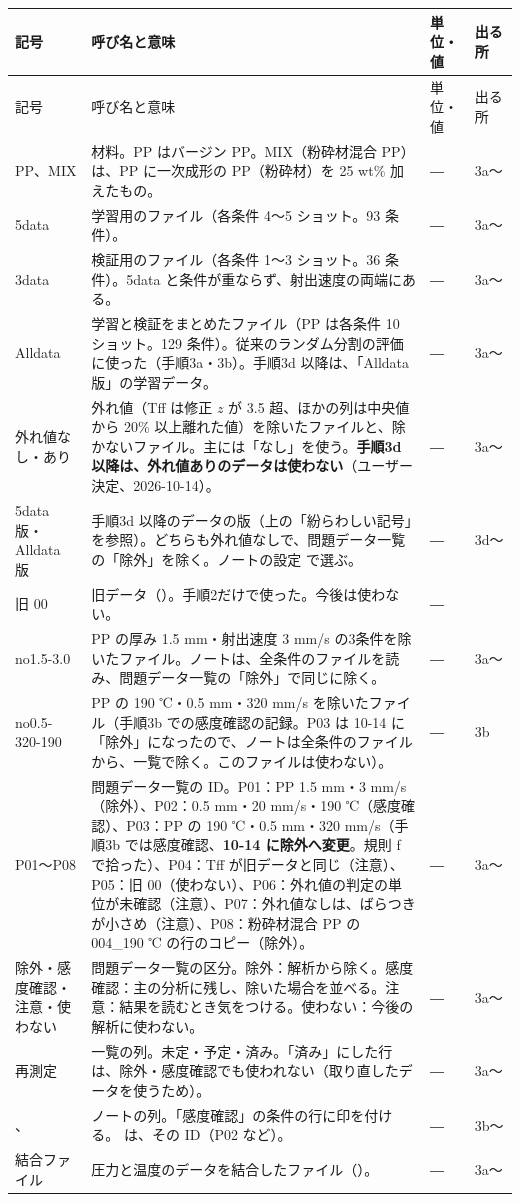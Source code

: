 \documentclass[paper=a4paper,fontsize=10.5pt,line_length=44zw,number_of_lines=38]{jlreq}
\makeatletter
\newcommand{\file}[1]{\texttt{\detokenize{#1}}}
\newenvironment{symtab}{%
  \begin{longtable}{@{}>{\raggedright\arraybackslash}p{6.5\zw}>{\raggedright\arraybackslash}p{22\zw}>{\raggedright\arraybackslash}p{6\zw}>{\raggedright\arraybackslash}p{4.5\zw}@{}}
  \toprule 記号 & 呼び名と意味 & 単位・値 & 出る所 \\ \midrule \endfirsthead
  \toprule 記号 & 呼び名と意味 & 単位・値 & 出る所 \\ \midrule \endhead
  \bottomrule \endlastfoot}{\end{longtable}}
\makeatother
\begin{document}
\begin{symtab}
PP、MIX & 材料。PP はバージン PP。MIX（粉砕材混合 PP）は、PP に一次成形の PP（粉砕材）を 25 wt\% 加えたもの。 & ― & 3a〜 \\
5data & 学習用のファイル（各条件 4〜5 ショット。93 条件）。 & ― & 3a〜 \\
3data & 検証用のファイル（各条件 1〜3 ショット。36 条件）。5data と条件が重ならず、射出速度の両端にある。 & ― & 3a〜 \\
Alldata & 学習と検証をまとめたファイル（PP は各条件 10 ショット。129 条件）。従来のランダム分割の評価に使った（手順3a・3b）。手順3d 以降は、「Alldata 版」の学習データ。 & ― & 3a〜 \\
外れ値なし・あり & 外れ値（Tff は修正 $z$ が 3.5 超、ほかの列は中央値から 20\% 以上離れた値）を除いたファイルと、除かないファイル。主には「なし」を使う。\textbf{手順3d 以降は、外れ値ありのデータは使わない}（ユーザー決定、2026-10-14）。 & ― & 3a〜 \\
5data 版・Alldata 版 & 手順3d 以降のデータの版（上の「紛らわしい記号」を参照）。どちらも外れ値なしで、問題データ一覧の「除外」を除く。ノートの設定 \file{DATA_VERSIONS} で選ぶ。 & ― & 3d〜 \\
旧 00 & 旧データ（\file{学習データ6月発表時.csv}）。手順2だけで使った。今後は使わない。 & ― & 2 \\
no1.5-3.0 & PP の厚み 1.5 mm・射出速度 3 mm/s の3条件を除いたファイル。ノートは、全条件のファイルを読み、問題データ一覧の「除外」で同じに除く。 & ― & 3a〜 \\
no0.5-320-190 & PP の 190 ℃・0.5 mm・320 mm/s を除いたファイル（手順3b での感度確認の記録。P03 は 10-14 に「除外」になったので、ノートは全条件のファイルから、一覧で除く。このファイルは使わない）。 & ― & 3b \\
P01〜P08 & 問題データ一覧の ID。P01：PP 1.5 mm・3 mm/s（除外）、P02：0.5 mm・20 mm/s・190 ℃（感度確認）、P03：PP の 190 ℃・0.5 mm・320 mm/s（手順3b では感度確認、\textbf{10-14 に除外へ変更}。規則 f で拾った）、P04：Tff が旧データと同じ（注意）、P05：旧 00（使わない）、P06：外れ値の判定の単位が未確認（注意）、P07：外れ値なしは、ばらつきが小さめ（注意）、P08：粉砕材混合 PP の 004\_190 ℃ の行のコピー（除外）。 & ― & 3a〜 \\
除外・感度確認・注意・使わない & 問題データ一覧の区分。除外：解析から除く。感度確認：主の分析に残し、除いた場合を並べる。注意：結果を読むとき気をつける。使わない：今後の解析に使わない。 & ― & 3a〜 \\
再測定 & 一覧の列。未定・予定・済み。「済み」にした行は、除外・感度確認でも使われない（取り直したデータを使うため）。 & ― & 3a〜 \\
\file{is_sens}、\file{sens} & ノートの列。「感度確認」の条件の行に印を付ける。\file{sens} は、その ID（P02 など）。 & ― & 3b〜 \\
結合ファイル & 圧力と温度のデータを結合したファイル（\file{結合_<番号>_<材料>_max_<組>_外れ値<あり|なし>.csv}）。 & ― & 3a〜 \\
\end{symtab}
\end{document}

